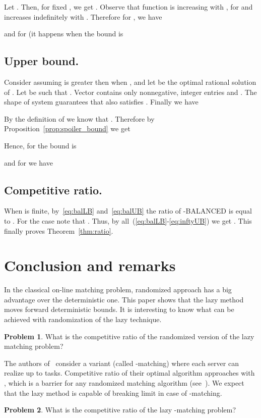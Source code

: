 \documentclass[12pt]{amsart}
\theoremstyle{definition}
\newtheorem{problem}{Problem}
\newcommand{\Alg}[0]{\textsf{BALANCED}\xspace}
\begin{document}
Let . 
Then, for fixed , we get . 
Observe that function  is increasing with , for  and  increases indefinitely with .
Therefore for , we have

and for  (it happens when  the bound is


\subsection{Upper bound.}
Consider  assuming  is greater then  when ,
and let  be the optimal rational solution of .
Let  be such that .
Vector  contains only nonnegative, integer entries and . 
The shape of system  guarantees that  also satisfies .
Finally we have

By the definition of  we know that .
Therefore by Proposition~\ref{prop:spoiler_bound} we get

Hence, for  the bound is

and for  we have



\subsection{Competitive ratio.}
When  is finite, by~\eqref{eq:balLB} and~\eqref{eq:balUB} the ratio of -\Alg{} is equal to  .
For the case  note that .
Thus, by all~(\ref{eq:balLB}-\ref{eq:inftyUB}) we get .
This finally proves Theorem~\ref{thm:ratio}.


\section{Conclusion and remarks}\label{sec:remarks}


In the classical on-line matching problem, randomized approach has a big advantage over the deterministic one. 
This paper shows that the lazy method moves forward deterministic bounds. 
It is interesting to know what can be achieved with randomization of the lazy technique. 
\begin{problem}
 What is the competitive ratio of the randomized version of the lazy matching problem?
\end{problem}

The authors of~\cite{KalKir2000} consider a variant (called -matching) where each server can realize up to  tasks. 
Competitive ratio of their optimal algorithm approaches  with , which is a barrier for any randomized matching algorithm (see~\cite{KVV90}). 
We expect that the lazy method  is capable of breaking  limit in case of -matching.
\begin{problem}
 What is the competitive ratio of the lazy -matching problem?
\end{problem}


 
\end{document}
